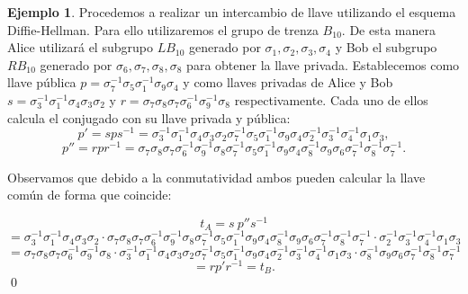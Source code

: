 \documentclass[12pt]{book}
\theoremstyle{definition}
\newtheorem{ejem}{Ejemplo}[section]
\begin{document}
\begin{ejem}
Procedemos a realizar un intercambio de llave utilizando el esquema Diffie-Hellman. Para ello utilizaremos el grupo de trenza $B_{10}$. De esta manera Alice utilizará el subgrupo $LB_{10}$ generado por $\sigma_1,\sigma_2,\sigma_3,\sigma_4$ y Bob el subgrupo $RB_{10}$ generado por $\sigma_6,\sigma_7,\sigma_8,\sigma_8$ para obtener la llave privada. Establecemos como llave pública $p=\sigma_7^{-1}\sigma_5\sigma_1^{-1}\sigma_9\sigma_4$ y como llaves privadas de Alice y Bob $s = \sigma_3^{-1}\sigma_1^{-1}\sigma_4\sigma_3\sigma_2$ y $r = \sigma_7\sigma_8\sigma_7\sigma_6^{-1}\sigma_9^{-1}\sigma_8$ respectivamente. Cada uno de ellos calcula el conjugado con su llave privada y pública:
$$p' = sps^{-1}=\sigma_3^{-1}\sigma_1^{-1}\sigma_4\sigma_3\sigma_2 \sigma_7^{-1}\sigma_5\sigma_1^{-1}\sigma_9\sigma_4 \sigma_2^{-1}\sigma_3^{-1}\sigma_4^{-1}\sigma_1\sigma_3,$$
$$p'' = rpr^{-1} = \sigma_7\sigma_8\sigma_7\sigma_6^{-1}\sigma_9^{-1}\sigma_8 \sigma_7^{-1}\sigma_5\sigma_1^{-1}\sigma_9\sigma_4 \sigma_8^{-1}\sigma_9\sigma_6\sigma_7^{-1}\sigma_8^{-1}\sigma_7^{-1}.$$


Observamos que debido a la conmutatividad ambos pueden calcular la llave común de forma que coincide:

$$t_A = s\ p''s^{-1} $$$$= \sigma_3^{-1}\sigma_1^{-1}\sigma_4\sigma_3\sigma_2\cdot \sigma_7\sigma_8\sigma_7\sigma_6^{-1}\sigma_9^{-1}\sigma_8 \sigma_7^{-1}\sigma_5\sigma_1^{-1}\sigma_9\sigma_4 \sigma_8^{-1}\sigma_9\sigma_6\sigma_7^{-1}\sigma_8^{-1}\sigma_7^{-1}\cdot\sigma_2^{-1}\sigma_3^{-1}\sigma_4^{-1}\sigma_1\sigma_3$$
$$=\sigma_7\sigma_8\sigma_7\sigma_6^{-1}\sigma_9^{-1}\sigma_8\cdot \sigma_3^{-1}\sigma_1^{-1}\sigma_4\sigma_3\sigma_2 \sigma_7^{-1}\sigma_5\sigma_1^{-1}\sigma_9\sigma_4 \sigma_2^{-1}\sigma_3^{-1}\sigma_4^{-1}\sigma_1\sigma_3\cdot
\sigma_8^{-1}\sigma_9\sigma_6\sigma_7^{-1}\sigma_8^{-1}\sigma_7^{-1} $$
$$= rp'r^{-1} = t_B.$$ \qed
\end{ejem}
\end{document}
